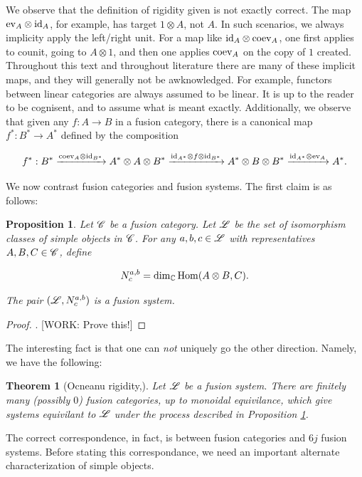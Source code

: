 \documentclass{article}
\newtheorem{theorem}{Theorem}[section]
\newtheorem{proposition}{Proposition}[section]
\theoremstyle{definition}
\numberwithin{figure}{section}
\begin{document}
We observe that the definition of rigidity given is not exactly correct. The map $\mathrm{ev}_{A}\otimes \mathrm{id}_A$, for example, has target $1\otimes A$, not $A$. In such scenarios, we always implicity apply the left/right unit. For a map like $\mathrm{id}_A\otimes \mathrm{coev}_A$, one first applies to counit, going to $A\otimes 1$, and then one applies $\mathrm{coev}_A$ on the copy of $1$ created. Throughout this text and throughout literature there are many of these implicit maps, and they will generally not be awknowledged. For example, functors between linear categories are always assumed to be linear. It is up to the reader to be cognisent, and to assume what is meant exactly. Additionally, we observe that given any $f:A\to B$ in a fusion category, there is a canonical map $f^{*}:B^*\to A^*$ defined by the composition

$$f^*:B^*\xrightarrow{\mathrm{coev}_A\otimes \mathrm{id}_{B^*}} A^*\otimes A\otimes B^*\xrightarrow{\mathrm{id}_{A^*}\otimes f\otimes \mathrm{id}_{B^*}} A^*\otimes B\otimes B^* \xrightarrow{\mathrm{id}_{A^*}\otimes \mathrm{ev}_A} A^*.$$

We now contrast fusion categories and fusion systems. The first claim is as follows:

\begin{proposition}\label{Make fusion system} Let $\mathscr{C}$ be a fusion category. Let $\mathscr{L}$ be the set of isomorphism classes of simple objects in $\mathscr{C}$. For any $a,b,c\in \mathscr{L}$ with representatives $A,B,C\in\mathscr{C}$, define

$$N^{a,b}_c=\dim_{\mathbb{C}}\mathrm{Hom}(A\otimes B, C).$$

The pair $(\mathscr{L},N^{a,b}_{c})$ is a fusion system.
\end{proposition}
\begin{proof}. [WORK: Prove this!]
\end{proof}

The interesting fact is that one can \textit{not} uniquely go the other direction. Namely, we have the following:

\begin{theorem}[Ocneanu rigidity,\cite{gainutdinov2023davydov}] Let $\mathscr{L}$ be a fusion system. There are finitely many (possibly $0$) fusion categories, up to monoidal equivilance, which give systems equivilant to $\mathscr{L}$ under the process described in Proposition \ref{Make fusion system}.
\end{theorem}

The correct correspondence, in fact, is between fusion categories and $6j$ fusion systems. Before stating this correspondance, we need an important alternate characterization of simple objects.
\end{document}
